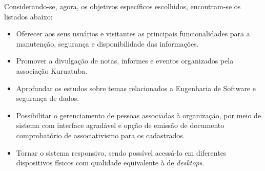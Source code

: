 Considerando-se, agora, os objetivos específicos escolhidos, encontram-se os listados abaixo:  
\begin{itemize}
 \item Oferecer aos seus usuários e visitantes as principais funcionalidades para a manutenção, segurança e disponibilidade das informações.
 
 \item Promover a divulgação de notas, informes e eventos organizados pela associação Kuruatuba.
 
 \item Aprofundar os estudos sobre temas relacionados a Engenharia de Software e segurança de dados.
 
 \item Possibilitar o gerenciamento de pessoas associadas à organização, por meio de sistema com interface agradável e opção de emissão de documento comprobatório de associativismo para os cadastrados. 
 
 \item Tornar o sistema responsivo, sendo possível acessá-lo em diferentes dispositivos físicos com qualidade equivalente à de \textit{desktops}.  
\end{itemize}



